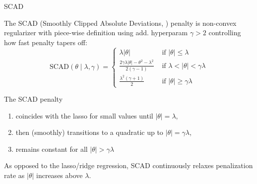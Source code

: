 \documentclass[11pt,compress,t,notes=noshow, xcolor=table]{beamer}
\begin{document}
\begin{vbframe}{SCAD}

The SCAD ({\footnotesize{Smoothly Clipped Absolute Deviations}, }) penalty is non-convex regularizer with piece-wise definition using add. hyperparam $\gamma>2$ controlling how fast penalty tapers off:
$$
\text{SCAD}(\theta \mid \lambda, \gamma)= \begin{cases}\lambda|\theta| & \text { if }|\theta| \leq \lambda \\ \frac{2 \gamma \lambda|\theta|-\theta^2-\lambda^2}{2(\gamma-1)} & \text { if } \lambda<|\theta|<\gamma \lambda \\ \frac{\lambda^2(\gamma+1)}{2} & \text { if }|\theta| \geq \gamma \lambda\end{cases}
$$

The SCAD penalty 
\begin{enumerate}
    \item coincides with the lasso for small values until $|\theta|=\lambda$,
    \item then (smoothly) transitions to a quadratic up to $|\theta|=\gamma \lambda$,
    \item remains constant for all $|\theta|>\gamma \lambda$
\end{enumerate}
\vspace{0.3cm}
As opposed to the lasso/ridge regression, SCAD continuously relaxes penalization rate as $|\theta|$ increases above $\lambda$. %


\end{vbframe}
\end{document}
